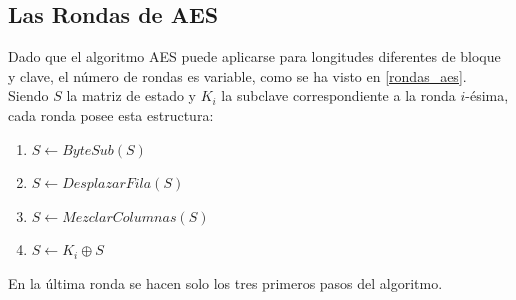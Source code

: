 \newpage
\subsection{Las Rondas de AES}
Dado que el algoritmo AES puede aplicarse para longitudes diferentes de bloque y clave, el número de rondas es variable, como se ha visto en \ref{rondas_aes}.\\
Siendo $S$ la matriz de estado y $K_i$ la subclave correspondiente a la ronda $i$-ésima, cada ronda posee esta estructura:
\begin{enumerate}
	\item $S \leftarrow ByteSub(S)$
	\item $S \leftarrow DesplazarFila(S)$
	\item $S \leftarrow MezclarColumnas(S)$
	\item $S \leftarrow K_i \oplus S$
\end{enumerate}
En la última ronda se hacen solo los tres primeros pasos del algoritmo.

